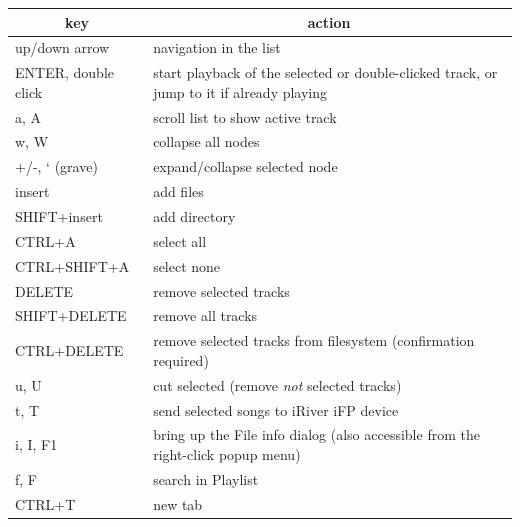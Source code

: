 \documentclass[10pt,english]{article}
\begin{document}
\begin{center}\begin{tabular}{|m{4cm}|m{10cm}|}\hline \multicolumn{1}{|c|}{\textbf{key}} & \multicolumn{1}{c|}{\textbf{action}} \\ \hline \hline 

up/down arrow&
navigation in the list
\\ \hline 

ENTER, double click&
start playback of the selected or double-clicked track, or jump to it if already playing
\\ \hline 

a, A&
scroll list to show active track
\\ \hline 

w, W&
collapse all nodes
\\ \hline 

+/-, ` (grave)&
expand/collapse selected node
\\ \hline 
\hline 

insert&
add files
\\ \hline 

SHIFT+insert&
add directory
\\ \hline 
\hline 

CTRL+A&
select all
\\ \hline 

CTRL+SHIFT+A&
select none
\\ \hline 
\hline 

DELETE&
remove selected tracks
\\ \hline 

SHIFT+DELETE&
remove all tracks
\\ \hline 

CTRL+DELETE&
remove selected tracks from filesystem (confirmation required)
\\ \hline 

u, U&
cut selected (remove \emph{not} selected tracks)
\\ \hline 
\hline 

t, T&
send selected songs to iRiver iFP device
\\ \hline 

i, I, F1&
bring up the File info dialog (also accessible from the right-click popup menu)
\\ \hline 

f, F&
search in Playlist
\\ \hline 
\hline 

CTRL+T&
new tab
\\ \hline 


\end{tabular}
\end{center}
\end{document}
